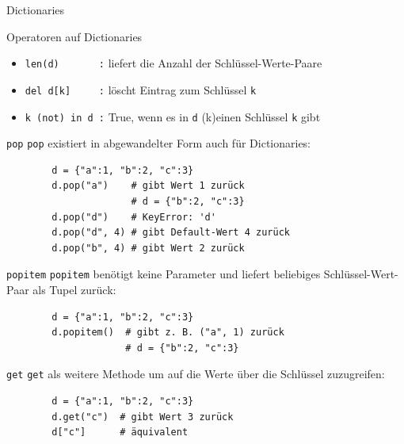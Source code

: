 \documentclass[utf8, smaller, c]{beamer}
\renewcommand{\tt}[1]{{\texttt{#1}}}
\begin{document}
\begin{frame}{Dictionaries}
	\pagebreak
	
	\begin{block}{Operatoren auf Dictionaries}
		\begin{itemize}
			\item \verb+len(d)       :+ liefert die Anzahl der Schlüssel-Werte-Paare
			\item \verb+del d[k]     :+ löscht Eintrag zum Schlüssel \tt{k}
			\item \verb+k (not) in d :+ True, wenn es in \tt{d} (k)einen Schlüssel \tt{k} gibt
		\end{itemize}
	\end{block}
	\vspace{-2mm}
	\begin{block}{\tt{pop}}
		\verb+pop+ existiert in abgewandelter Form auch für Dictionaries:
		\begin{verbatim}
		d = {"a":1, "b":2, "c":3}
		d.pop("a")    # gibt Wert 1 zurück
		              # d = {"b":2, "c":3}
		d.pop("d")    # KeyError: 'd'
		d.pop("d", 4) # gibt Default-Wert 4 zurück
		d.pop("b", 4) # gibt Wert 2 zurück
		\end{verbatim}
	\end{block}

	\pagebreak
	
	\begin{block}{\tt{popitem}}
		\verb+popitem+ benötigt keine Parameter und liefert beliebiges Schlüssel-Wert-Paar als Tupel zurück:
		\begin{verbatim}
		d = {"a":1, "b":2, "c":3}
		d.popitem()  # gibt z. B. ("a", 1) zurück
		             # d = {"b":2, "c":3}
		\end{verbatim}
	\end{block}
	\vspace{-2mm}
	\begin{block}{\tt{get}}
	\verb+get+ als weitere Methode um auf die Werte über die Schlüssel zuzugreifen:
		\begin{verbatim}
		d = {"a":1, "b":2, "c":3}
		d.get("c")  # gibt Wert 3 zurück
		d["c"]      # äquivalent
		\end{verbatim}
	\end{block}

	\pagebreak


\end{frame}
\end{document}
